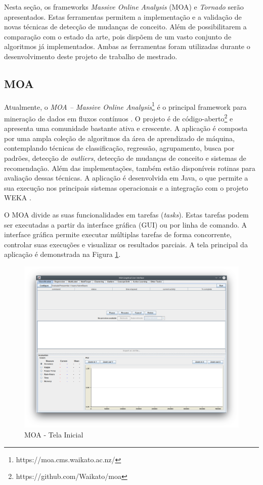 \documentclass[qual, classic, a4paper]{ufbathesis}
\begin{document}
Nesta seção, os frameworks \textit{Massive Online Analysis} (MOA) e \textit{Tornado} serão apresentados.
Estas ferramentas permitem a implementação e a validação de novas técnicas de detecção de mudanças de conceito.
Além de possibilitarem a comparação com o estado da arte, pois dispõem de um vasto conjunto de algoritmos já implementados.
Ambas as ferramentas foram utilizadas durante o desenvolvimento deste projeto de trabalho de mestrado.

\subsection{MOA}

Atualmente, o \textit{MOA – Massive Online Analysis}\footnote{https://moa.cms.waikato.ac.nz/} é o principal framework para mineração de dados em fluxos contínuos \cite{Bifet:2010:MMO:1756006.1859903}.
O projeto é de código-aberto\footnote{https://github.com/Waikato/moa} e apresenta uma comunidade bastante ativa e crescente.
A aplicação é composta por uma ampla coleção de algoritmos da área de aprendizado de máquina, contemplando técnicas de classificação, regressão, agrupamento, busca por padrões, detecção de \textit{outliers}, detecção de mudanças de conceito e sistemas de recomendação.
Além das implementações, também estão disponíveis rotinas para avaliação dessas técnicas.
A aplicação é desenvolvida em Java, o que permite a sua execução nos principais sistemas operacionais e a integração com o projeto WEKA \cite{Hall:2009:WDM:1656274.1656278}.

O MOA divide as suas funcionalidades em tarefas (\textit{tasks}).
Estas tarefas podem ser executadas a partir da interface gráfica (GUI) ou por linha de comando.
A interface gráfica permite executar múltiplas tarefas de forma concorrente, 
controlar suas execuções e visualizar os resultados parciais.
A tela principal da aplicação é demonstrada na Figura \ref{fig:moa}.

\begin{figure}[H]
\begin{center}
    \includegraphics[scale=0.4]{imagens/moa.png}
    \caption{MOA - Tela Inicial}
    \label{fig:moa}
\end{center}
\end{figure}
\end{document}
